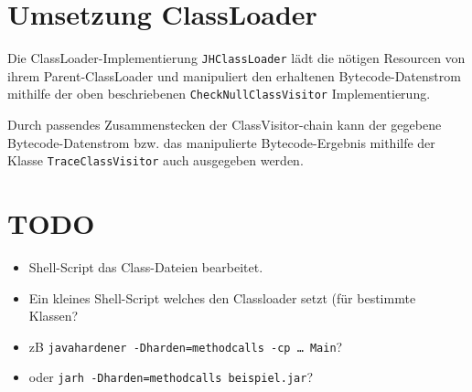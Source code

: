 \section{Umsetzung ClassLoader}

Die ClassLoader-Implementierung \texttt{JHClassLoader} lädt die nötigen Resourcen
von ihrem Parent-ClassLoader und manipuliert den erhaltenen Bytecode-Datenstrom
mithilfe der oben beschriebenen \texttt{CheckNullClassVisitor} Implementierung.

Durch passendes Zusammenstecken der ClassVisitor-chain kann der gegebene
Bytecode-Datenstrom bzw. das manipulierte Bytecode-Ergebnis mithilfe der
Klasse \texttt{TraceClassVisitor} auch ausgegeben werden.


\section{TODO}


\begin{itemize}
\item Shell-Script das Class-Dateien bearbeitet.
\item Ein kleines Shell-Script welches den Classloader setzt (für bestimmte Klassen?
\item zB \texttt{javahardener -Dharden=methodcalls -cp … Main}?
\item oder \texttt{jarh -Dharden=methodcalls beispiel.jar}?
\end{itemize}


